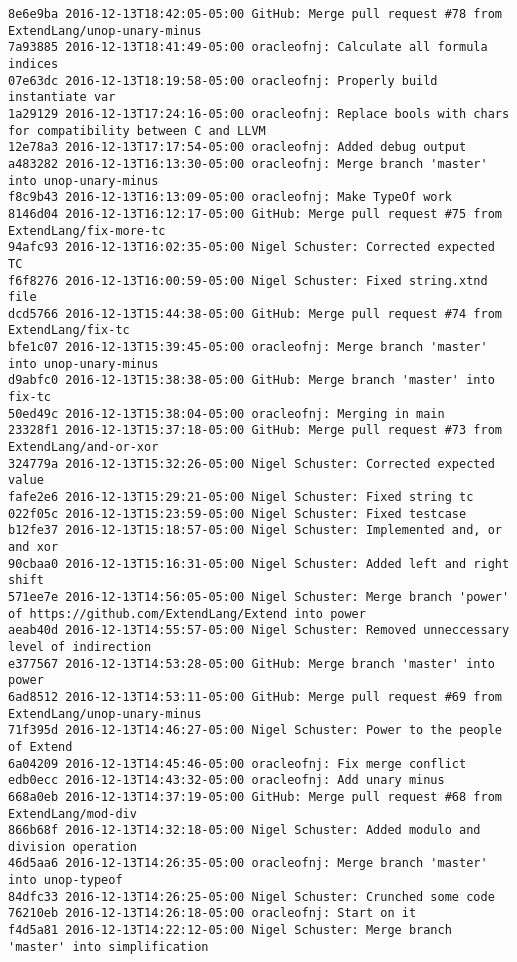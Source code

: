 \begin{lstlisting}
8e6e9ba 2016-12-13T18:42:05-05:00 GitHub: Merge pull request #78 from ExtendLang/unop-unary-minus
7a93885 2016-12-13T18:41:49-05:00 oracleofnj: Calculate all formula indices
07e63dc 2016-12-13T18:19:58-05:00 oracleofnj: Properly build instantiate var
1a29129 2016-12-13T17:24:16-05:00 oracleofnj: Replace bools with chars for compatibility between C and LLVM
12e78a3 2016-12-13T17:17:54-05:00 oracleofnj: Added debug output
a483282 2016-12-13T16:13:30-05:00 oracleofnj: Merge branch 'master' into unop-unary-minus
f8c9b43 2016-12-13T16:13:09-05:00 oracleofnj: Make TypeOf work
8146d04 2016-12-13T16:12:17-05:00 GitHub: Merge pull request #75 from ExtendLang/fix-more-tc
94afc93 2016-12-13T16:02:35-05:00 Nigel Schuster: Corrected expected TC
f6f8276 2016-12-13T16:00:59-05:00 Nigel Schuster: Fixed string.xtnd file
dcd5766 2016-12-13T15:44:38-05:00 GitHub: Merge pull request #74 from ExtendLang/fix-tc
bfe1c07 2016-12-13T15:39:45-05:00 oracleofnj: Merge branch 'master' into unop-unary-minus
d9abfc0 2016-12-13T15:38:38-05:00 GitHub: Merge branch 'master' into fix-tc
50ed49c 2016-12-13T15:38:04-05:00 oracleofnj: Merging in main
23328f1 2016-12-13T15:37:18-05:00 GitHub: Merge pull request #73 from ExtendLang/and-or-xor
324779a 2016-12-13T15:32:26-05:00 Nigel Schuster: Corrected expected value
fafe2e6 2016-12-13T15:29:21-05:00 Nigel Schuster: Fixed string tc
022f05c 2016-12-13T15:23:59-05:00 Nigel Schuster: Fixed testcase
b12fe37 2016-12-13T15:18:57-05:00 Nigel Schuster: Implemented and, or and xor
90cbaa0 2016-12-13T15:16:31-05:00 Nigel Schuster: Added left and right shift
571ee7e 2016-12-13T14:56:05-05:00 Nigel Schuster: Merge branch 'power' of https://github.com/ExtendLang/Extend into power
aeab40d 2016-12-13T14:55:57-05:00 Nigel Schuster: Removed unneccessary level of indirection
e377567 2016-12-13T14:53:28-05:00 GitHub: Merge branch 'master' into power
6ad8512 2016-12-13T14:53:11-05:00 GitHub: Merge pull request #69 from ExtendLang/unop-unary-minus
71f395d 2016-12-13T14:46:27-05:00 Nigel Schuster: Power to the people of Extend
6a04209 2016-12-13T14:45:46-05:00 oracleofnj: Fix merge conflict
edb0ecc 2016-12-13T14:43:32-05:00 oracleofnj: Add unary minus
668a0eb 2016-12-13T14:37:19-05:00 GitHub: Merge pull request #68 from ExtendLang/mod-div
866b68f 2016-12-13T14:32:18-05:00 Nigel Schuster: Added modulo and division operation
46d5aa6 2016-12-13T14:26:35-05:00 oracleofnj: Merge branch 'master' into unop-typeof
84dfc33 2016-12-13T14:26:25-05:00 Nigel Schuster: Crunched some code
76210eb 2016-12-13T14:26:18-05:00 oracleofnj: Start on it
f4d5a81 2016-12-13T14:22:12-05:00 Nigel Schuster: Merge branch 'master' into simplification

\end{lstlisting}
